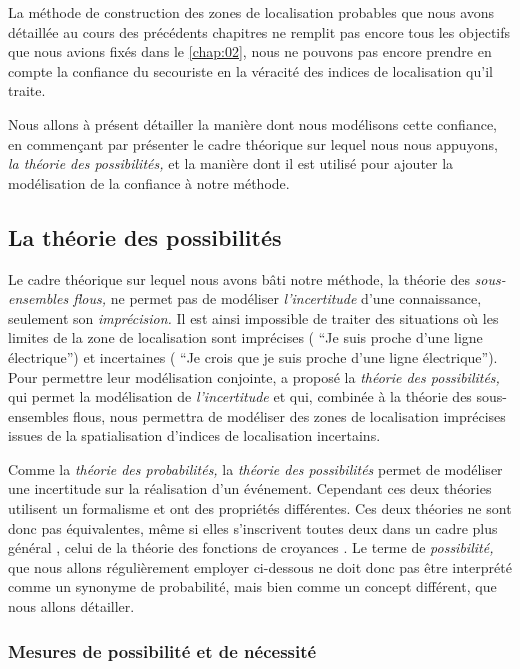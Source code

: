 La méthode de construction des zones de localisation probables que
nous avons détaillée au cours des précédents chapitres ne remplit pas
encore tous les objectifs que nous avions fixés dans le
\autoref{chap:02}, nous ne pouvons pas encore prendre en compte la
confiance du secouriste en la véracité des indices de localisation
qu'il traite.

Nous allons à présent détailler la manière dont nous modélisons cette
confiance, en commençant par présenter le cadre théorique sur lequel
nous nous appuyons, \emph{la théorie des possibilités,} et la manière
dont il est utilisé pour ajouter la modélisation de la confiance à
notre méthode.

\subsection{La théorie des possibilités}

Le cadre théorique sur lequel nous avons bâti notre méthode, la
théorie des \emph{sous-ensembles flous,} ne permet pas de modéliser
\emph{l'incertitude} d'une connaissance, seulement son
\emph{imprécision.} Il est ainsi impossible de traiter des situations
où les limites de la zone de localisation sont imprécises (\eg
\enquote{Je suis proche d'une ligne électrique}) et incertaines (\eg
\enquote{Je crois que je suis proche d'une ligne électrique}). Pour
permettre leur modélisation conjointe, \textcite{Zadeh1978} a proposé
la \emph{théorie des possibilités,} qui permet la modélisation de
\emph{l'incertitude} et qui, combinée à la théorie des sous-ensembles
flous, nous permettra de modéliser des zones de localisation
imprécises issues de la spatialisation d'indices de localisation
incertains.

Comme la \emph{théorie des probabilités,} la \emph{théorie des
  possibilités} permet de modéliser une incertitude sur la réalisation
d'un événement. Cependant ces deux théories utilisent un formalisme et
ont des propriétés différentes. Ces deux théories ne sont donc pas
équivalentes, même si elles s’inscrivent toutes deux dans un cadre
plus général \autocite{Bouchon-Meunier1995}, celui de la théorie des
fonctions de croyances \autocite{Shafer1976}. Le terme de
\emph{possibilité,} que nous allons régulièrement employer ci-dessous
ne doit donc pas être interprété comme un synonyme de probabilité,
mais bien comme un concept différent, que nous allons détailler.

\subsubsection{Mesures de possibilité et de nécessité}

